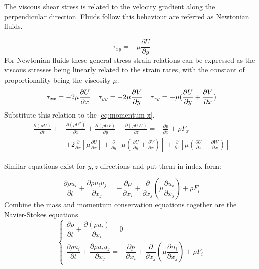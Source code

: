 \documentclass{article}
\begin{document}
The viscous shear stress is related to the velocity gradient along the perpendicular direction. Fluids follow this behaviour are referred as Newtonian fluids.

\begin{equation}
\tau_{xy} = -\mu \frac{\partial U}{\partial y}
\end{equation}
For Newtonian ﬂuids these general stress-strain relations can be expressed as the viscous stresses being linearly related to the strain rates, with the constant of proportionality being the viscosity $\mu$.
\begin{equation}
\tau_{xx} = -2\mu \frac{\partial U}{\partial x} \textbf{\quad}   \tau_{yy} = -2\mu \frac{\partial V}{\partial y} \textbf{\quad} \tau_{xy} = -\mu( \frac{\partial U}{\partial y} + \frac{\partial V}{\partial x})
\end{equation}
Substitute this relation to the \ref{eq:momentum x}. 
\begin{align*}
\frac{\partial(\rho U)}{\partial t} + &\frac{\partial (\rho U^2)}{\partial x} + \frac{\partial (\rho UV)}{\partial y} +\frac{\partial (\rho UW)}{\partial z} = -\frac{\partial p}{\partial x} + \rho F_x \\
&+2\frac{\partial}{\partial x}\left[\mu \frac{\partial U}{\partial x}\right] + \frac{\partial}{\partial y}\left[ \mu \left(\frac{\partial U}{\partial y} + \frac{\partial V}{\partial x} \right) \right] + \frac{\partial}{\partial z}\left[ \mu \left(\frac{\partial U}{\partial z} + \frac{\partial W}{\partial x} \right) \right]
\label{eq:momentum x without tau}
\end{align*}

Similar equations exist for $y, z$ directions and put them in index form:

\begin{equation}
\frac{\partial \rho u_i}{\partial t} + \frac{\partial \rho u_i u_j}{\partial x_j} = -\frac{\partial p}{\partial x_i} + \frac{\partial }{\partial x_j}\left(\mu \frac{\partial u_i}{\partial x_j}\right) + \rho F_i
\end{equation}
Combine the mass and momentum conservation equations together are the Navier-Stokes equations. 
\begin{equation}
	\begin{cases}
    		\dfrac{\partial \rho}{\partial t} + \dfrac{\partial (\rho u_i)}{\partial x_i} = 0  \\
        \dfrac{\partial \rho u_i}{\partial t} + \dfrac{\partial \rho u_i u_j}{\partial x_j} = -\dfrac{\partial p}{\partial x_i} + \dfrac{\partial }{\partial x_j}\left(\mu \dfrac{\partial u_i}{\partial x_j}\right) + \rho F_i
    \end{cases}
\end{equation}
\end{document}
